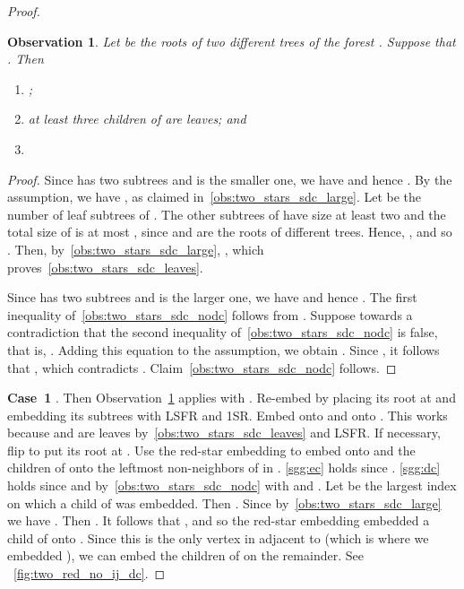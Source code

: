 \documentclass[11pt,a4paper,colorlinks=true,urlcolor=blue,citecolor=red]{article}
\theoremstyle{plain}
\newtheorem{observation}[theorem]{Observation}
\newcommand{\case}[1]{\par\vspace{.5\baselineskip}\noindent\textbf{\sffamily Case~#1}}
\begin{document}
\begin{proof}
  \begin{observation}\label{obs:two_stars_sdc}
    Let  be the roots of two different trees of the
    forest . Suppose that . Then
    \begin{enumerate}[label={(P\arabic*)}]\setlength{\itemindent}{3\labelsep}
    \item\label{obs:two_stars_sdc_large} ;
    \item\label{obs:two_stars_sdc_leaves} at least three children of 
      are leaves; and
    \item\label{obs:two_stars_sdc_nodc} 
    \end{enumerate}
  \end{observation}
  \begin{proof}
    Since  has two subtrees and  is the smaller one, we have
     and hence . By
    the assumption, we have , as claimed
    in~\ref{obs:two_stars_sdc_large}. Let  be the number of
    leaf subtrees of . The other subtrees of  have size at least
    two and the total size of  is at most , since 
    and  are the roots of different trees. Hence,
    , and so
    . Then,
    by~\ref{obs:two_stars_sdc_large}, ,
    which proves~\ref{obs:two_stars_sdc_leaves}.

    Since  has two subtrees and  is the larger one, we have
     and hence . The
    first inequality of~\ref{obs:two_stars_sdc_nodc} follows from
    . Suppose towards a contradiction that the second
    inequality of~\ref{obs:two_stars_sdc_nodc} is false, that is,
    . Adding this equation to the
    assumption, we obtain . Since , it follows that
    , which contradicts .
    Claim~\ref{obs:two_stars_sdc_nodc} follows.
  \end{proof}

  \case{1} . Then
  Observation~\ref{obs:two_stars_sdc} applies with . Re-embed
   by placing its root at  and embedding its subtrees with
  LSFR and 1SR. Embed  onto  and  onto . This works
  because  and  are leaves by~\ref{obs:two_stars_sdc_leaves} and
  LSFR. If necessary, flip  to put its root at . Use
  the red-star embedding to embed  onto  and the children
  of  onto the leftmost  non-neighbors of  in
  . \ref{sgg:ec} holds since .
  \ref{sgg:dc} holds since  and
  by~\ref{obs:two_stars_sdc_nodc} with  and . Let  be
  the largest index on which a child of  was embedded. Then
  . Since 
  by~\ref{obs:two_stars_sdc_large} we have . Then
  . It follows that
  , and so the red-star embedding embedded a child of
   onto . Since this is the only vertex in  adjacent to
   (which is where we embedded ), we can embed the children of
   on the remainder. See \figurename~\ref{fig:two_red_no_ij_dc}.


\end{proof}
\end{document}
